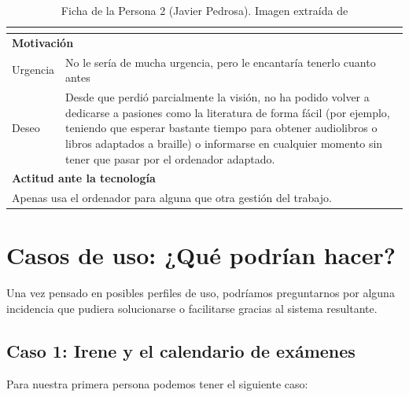 \begin{table}[H]
\begin{tabular}{|l|l|l|}
{		}                \\ 
		\hline
		\multicolumn{3}{|l|}{\cellcolor{lightblue}\textbf{Motivación}}                   \\ 
		\hline
		Urgencia     & \multicolumn{2}{l|}{
			\begin{minipage}[t]{0.7\textwidth}
				No le sería de mucha urgencia, pero le encantaría tenerlo cuanto antes
			\end{minipage}
		}                \\ 
		\hline
		Deseo        & \multicolumn{2}{l|}{
			\begin{minipage}[t]{0.7\textwidth}
				Desde que perdió parcialmente la visión, no ha podido volver a dedicarse a pasiones como la literatura de forma fácil (por ejemplo, teniendo que esperar bastante tiempo para obtener audiolibros o libros adaptados a braille) o informarse en cualquier momento sin tener que pasar por el ordenador adaptado.
			\end{minipage}
		}                \\ 
		\hline
		\multicolumn{3}{|l|}{\cellcolor{lightblue}\textbf{Actitud ante la tecnología}}    \\ 
		\hline
		\multicolumn{3}{|l|}{
			\begin{minipage}[t]{\textwidth}
				Apenas usa el ordenador para alguna que otra gestión del trabajo.
			\end{minipage}
		}                              \\
		\hline
	\end{tabular}
	\caption[Ficha Persona 2]{Ficha de la Persona 2 (Javier Pedrosa). Imagen extraída de \cite{thispersondoesnotexist}}
\end{table}

\newpage

\section{Casos de uso: ¿Qué podrían hacer?}

Una vez pensado en posibles perfiles de uso, podríamos preguntarnos por alguna incidencia que pudiera solucionarse o facilitarse gracias al sistema resultante.

\subsection{Caso 1: Irene y el calendario de exámenes}

Para nuestra primera persona podemos tener el siguiente caso:

